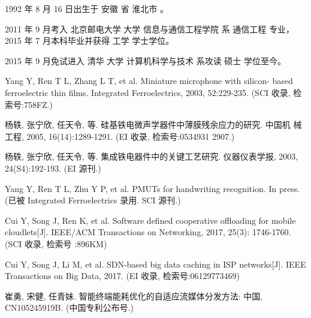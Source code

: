 \begin{resume}


  1992 年 8 月 16 日出生于 安徽 省 淮北市 。

  2011 年 9 月考入 北京邮电大学 大学 信息与通信工程学院 系 通信工程 专业，2015 年 7 月本科毕业并获得 工学 学士学位。

  2015 年 9 月免试进入 清华 大学 计算机科学与技术 系攻读 硕士 学位至今。


  \begin{publications}
    \item Yang Y, Ren T L, Zhang L T, et al. Miniature microphone with silicon-
      based ferroelectric thin films. Integrated Ferroelectrics, 2003,
      52:229-235. (SCI 收录, 检索号:758FZ.)
    \item 杨轶, 张宁欣, 任天令, 等. 硅基铁电微声学器件中薄膜残余应力的研究. 中国机
      械工程, 2005, 16(14):1289-1291. (EI 收录, 检索号:0534931 2907.)
    \item 杨轶, 张宁欣, 任天令, 等. 集成铁电器件中的关键工艺研究. 仪器仪表学报,
      2003, 24(S4):192-193. (EI 源刊.)
  \end{publications}

  \begin{publications}[before=\publicationskip,after=\publicationskip]
    \item Yang Y, Ren T L, Zhu Y P, et al. PMUTs for handwriting recognition. In
      press. (已被 Integrated Ferroelectrics 录用. SCI 源刊.)
  \end{publications}

  \begin{publications}
    \item Cui Y, Song J, Ren K, et al. Software defined cooperative offloading for mobile cloudlets[J]. IEEE/ACM Transactions on Networking, 2017, 25(3): 1746-1760. (SCI 收录, 检索号
      :896KM)
    \item Cui Y, Song J, Li M, et al. SDN-based big data caching in ISP networks[J]. IEEE Transactions on Big Data, 2017. (EI 收录, 检索号:06129773469)
  \end{publications}

  \begin{achievements}
    \item 崔勇, 宋健, 任青妹. 智能终端能耗优化的自适应流媒体分发方法: 中国, CN105245919B. (中国专利公布号.)
  \end{achievements}

\end{resume}
